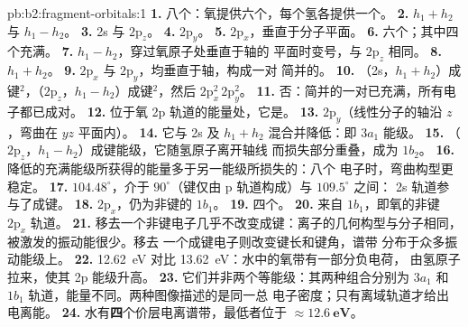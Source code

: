 \begin{solution}{pb:b2:fragment-orbitals:1}
\textbf{1.} 八个：氧提供六个，每个氢各提供一个。
\textbf{2.} $h_1 + h_2$ 与 $h_1 - h_2$。
\textbf{3.} 2s 与 $2\mathrm p_z$。
\textbf{4.} $2\mathrm p_y$。
\textbf{5.} $2\mathrm p_x$，垂直于分子平面。
\textbf{6.} 六个；其中四个充满。
\textbf{7.} $h_1 - h_2$，穿过氧原子处垂直于轴的
平面时变号，与 $2\mathrm p_z$ 相同。
\textbf{8.} $h_1 + h_2$。
\textbf{9.} $2\mathrm p_x$ 与 $2\mathrm p_y$，均垂直于轴，构成一对
简并的。
\textbf{10.} （2s，$h_1 + h_2$）成键$^2$，（$2\mathrm p_z$，$h_1 - h_2$）成键$^2$，然后
$2\mathrm p_x^2\,2\mathrm p_y^2$。
\textbf{11.} 否：简并的一对已充满，所有电子都已成对。
\textbf{12.} 位于氧 2p 轨道的能量处，它是。
\textbf{13.} $2\mathrm p_y$（线性分子的轴沿 $z$，弯曲在 $yz$ 平面内）。
\textbf{14.} 它与 2s 及 $h_1 + h_2$ 混合并降低：即 $3a_1$ 能级。
\textbf{15.} （$2\mathrm p_z$，$h_1 - h_2$）成键能级，它随氢原子离开轴线
而损失部分重叠，成为 $1b_2$。
\textbf{16.} 降低的充满能级所获得的能量多于另一能级所损失的：八个
电子时，弯曲构型更稳定。
\textbf{17.} $104.48^\circ$，介于 $90^\circ$（键仅由 p 轨道构成）与 $109.5^\circ$ 之间：
2s 轨道参与了成键。
\textbf{18.} $2\mathrm p_x$，仍为非键的 $1b_1$。
\textbf{19.} 四个。
\textbf{20.} 来自 $1b_1$，即氧的非键 $2\mathrm p_x$ 轨道。
\textbf{21.} 移去一个非键电子几乎不改变成键：离子的几何构型与分子相同，
被激发的振动能很少。移去
一个成键电子则改变键长和键角，谱带
分布于众多振动能级上。
\textbf{22.} \qty{12.62}{eV} 对比 \qty{13.62}{eV}：水中的氧带有一部分负电荷，
由氢原子拉来，使其 2p 能级升高。
\textbf{23.} 它们并非两个等能级：其两种组合分别为 $3a_1$ 和
$1b_1$ 轨道，能量不同。两种图像描述的是同一总
电子密度；只有离域轨道才给出电离能。
\textbf{24.} 水有\textbf{四}个价层电离谱带，最低者位于
$\boldsymbol{\approx \qty{12.6}{eV}}$。
\end{solution}
